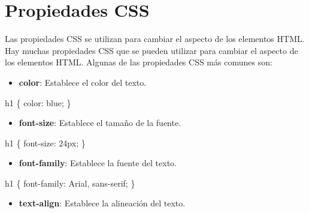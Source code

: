\documentclass[
  a4paper,
  DIV=11,
  numbers=noendperiod,
  onepage,
  openany]{scrreprt}
\newenvironment{Shaded}{\begin{snugshade}}{\end{snugshade}}
\newcommand{\ConstantTok}[1]{\textcolor[rgb]{0.56,0.35,0.01}{#1}}
\newcommand{\DataTypeTok}[1]{\textcolor[rgb]{0.68,0.00,0.00}{#1}}
\newcommand{\DecValTok}[1]{\textcolor[rgb]{0.68,0.00,0.00}{#1}}
\newcommand{\KeywordTok}[1]{\textcolor[rgb]{0.00,0.23,0.31}{#1}}
\newcommand{\NormalTok}[1]{\textcolor[rgb]{0.00,0.23,0.31}{#1}}
\newcommand{\OperatorTok}[1]{\textcolor[rgb]{0.37,0.37,0.37}{#1}}
\providecommand{\tightlist}{%
  \setlength{\itemsep}{0pt}\setlength{\parskip}{0pt}}\usepackage{longtable,booktabs,array}
\begin{document}
\section{Propiedades CSS}\label{propiedades-css}

Las propiedades CSS se utilizan para cambiar el aspecto de los elementos
HTML. Hay muchas propiedades CSS que se pueden utilizar para cambiar el
aspecto de los elementos HTML. Algunas de las propiedades CSS más
comunes son:

\begin{itemize}
\tightlist
\item
  \textbf{color}: Establece el color del texto.
\end{itemize}

\begin{Shaded}
\begin{Highlighting}[]
\NormalTok{h1 \{}
  \KeywordTok{color}\NormalTok{: }\ConstantTok{blue}\OperatorTok{;}
\NormalTok{\}}
\end{Highlighting}
\end{Shaded}

\begin{itemize}
\tightlist
\item
  \textbf{font-size}: Establece el tamaño de la fuente.
\end{itemize}

\begin{Shaded}
\begin{Highlighting}[]
\NormalTok{h1 \{}
  \KeywordTok{font{-}size}\NormalTok{: }\DecValTok{24}\DataTypeTok{px}\OperatorTok{;}
\NormalTok{\}}
\end{Highlighting}
\end{Shaded}

\begin{itemize}
\tightlist
\item
  \textbf{font-family}: Establece la fuente del texto.
\end{itemize}

\begin{Shaded}
\begin{Highlighting}[]
\NormalTok{h1 \{}
  \KeywordTok{font{-}family}\NormalTok{: Arial}\OperatorTok{,} \DecValTok{sans{-}serif}\OperatorTok{;}
\NormalTok{\}}
\end{Highlighting}
\end{Shaded}

\begin{itemize}
\tightlist
\item
  \textbf{text-align}: Establece la alineación del texto.
\end{itemize}
\end{document}
